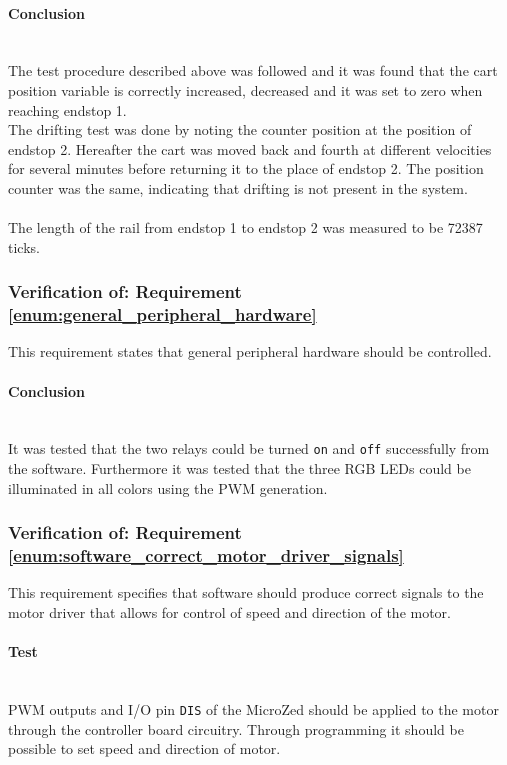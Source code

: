 \paragraph{Conclusion}~\\
The test procedure described above was followed and it was found that the cart position variable is correctly increased, decreased and it was set to zero when reaching endstop 1.
\\
The drifting test was done by noting the counter position at the position of endstop 2. 
Hereafter the cart was moved back and fourth at different velocities for several minutes before returning it to the place of endstop 2. 
The position counter was the same, indicating that drifting is not present in the system.
\\~\\
The length of the rail from endstop 1 to endstop 2 was measured to be 72387 ticks.

\subsubsection{Verification of: Requirement \ref{enum:general_peripheral_hardware}} %
\label{ssub:verification_of_requirement_enum:general_peripheral_hardware}
This requirement states that general peripheral hardware should be controlled.

\paragraph{Conclusion}~\\
It was tested that the two relays could be turned \texttt{on} and \texttt{off} successfully from the software.
Furthermore it was tested that the three RGB LEDs could be illuminated in all colors using the PWM generation.


\subsubsection{Verification of: Requirement \ref{enum:software_correct_motor_driver_signals}} %
\label{ssub:verification_of_requirement_enum:software_correct_motor_driver_signals}
This requirement specifies that software should produce correct signals to the motor driver that allows for control of speed and direction of the motor.

\paragraph{Test}~\\
PWM outputs and I/O pin \texttt{DIS} of the MicroZed should be applied to the motor through the controller board circuitry.
Through programming it should be possible to set speed and direction of motor.


